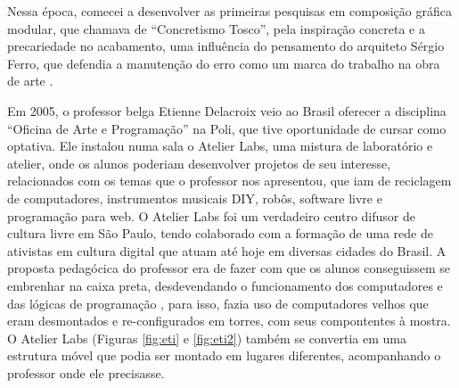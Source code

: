 Nessa época, comecei a desenvolver as primeiras pesquisas em composição gráfica modular, que chamava de ``Concretismo Tosco'', pela inspiração concreta e a precariedade no acabamento, uma influência do pensamento do arquiteto Sérgio Ferro, que defendia a manutenção do erro como um marca do trabalho na obra de arte \cite{FerroSergio2002}. 



Em 2005, o professor belga Etienne Delacroix veio ao Brasil oferecer a disciplina ``Oficina de Arte e Programação'' na Poli, que tive oportunidade de cursar como optativa. Ele instalou numa sala o Atelier Labs, uma mistura de laboratório e atelier, onde os alunos poderiam desenvolver projetos de seu interesse, relacionados com os temas que o professor nos apresentou, que iam de reciclagem de computadores, instrumentos musicais DIY, robôs, software livre e programação para web. O Atelier Labs foi um verdadeiro centro difusor de cultura livre em São Paulo, tendo colaborado com a formação de uma rede de ativistas em cultura digital que atuam até hoje em diversas cidades do Brasil. A proposta pedagócica do professor era de fazer com que os alunos conseguissem se embrenhar na caixa preta, desdevendando o funcionamento dos computadores e das lógicas de programação \cite{Delacroix2009}, para isso, fazia uso de computadores velhos que eram desmontados e re-configurados em torres, com seus compontentes à mostra. O Atelier Labs (Figuras \ref{fig:eti} e \ref{fig:eti2}) também se convertia em uma estrutura móvel que podia ser montado em lugares diferentes, acompanhando o professor onde ele precisasse.


